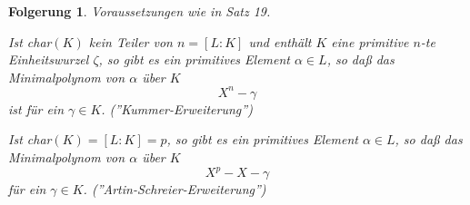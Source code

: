 \documentclass[a4paper,10pt,german]{scrbook}
\theoremstyle{saetze}
\theoremstyle{definitionen}
\newtheorem{Folg}[Def]{Folgerung}
\begin{document}
\begin{Folg}
Voraussetzungen wie in Satz 19.
\begin{enum}

\item Ist char$(K)$ kein Teiler von $n=[L:K]$ und enthält $K$ eine
primitive $n$-te Einheitswurzel $\zeta$, so gibt es ein primitives
Element $\alpha \in L$, so daß das Minimalpolynom von $\alpha$ über
$K$ \[X^n - \gamma\] ist für ein $\gamma \in K$.
(\textit{''Kummer-Erweiterung''})

\item Ist char$(K) = [L:K] = p$, so gibt es ein primitives Element
$\alpha \in L$, so daß das Minimalpolynom von $\alpha$ über $K$
\[ X^p - X - \gamma\] für ein $\gamma \in K$.
(\textit{''Artin-Schreier-Erweiterung''})

\end{enum}
\end{Folg}
\end{document}
